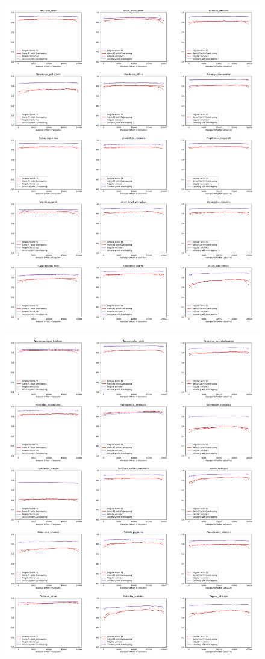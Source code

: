 \documentclass{article}
\begin{document}
\begin{figure}[!h]
\centerline{\includegraphics[width=1.2\textwidth]{images/overlapping/montage_animals8}}
\end{figure}
\begin{figure}[!h]
\centerline{\includegraphics[width=1.2\textwidth]{images/overlapping/montage_animals9}}
\end{figure}
\end{document}
